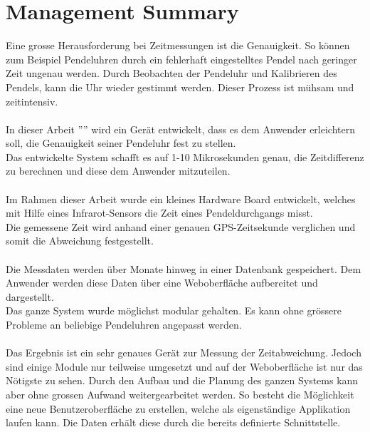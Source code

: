 \section{Management Summary}
Eine grosse Herausforderung bei Zeitmessungen ist die Genauigkeit. So können zum Beispiel Pendeluhren durch ein fehlerhaft eingestelltes Pendel nach geringer Zeit ungenau werden. Durch Beobachten der Pendeluhr und Kalibrieren des Pendels, kann die Uhr wieder gestimmt werden. Dieser Prozess ist mühsam und zeitintensiv.\\
\\
In dieser Arbeit ''\documenttitle'' wird ein Gerät entwickelt, dass es dem Anwender erleichtern soll, die Genauigkeit seiner Pendeluhr fest zu stellen.\\
Das entwickelte System schafft es auf 1-10 Mikrosekunden genau, die Zeitdifferenz zu berechnen und diese dem Anwender mitzuteilen.\\
\\
Im Rahmen dieser Arbeit wurde ein kleines Hardware Board entwickelt, welches mit Hilfe eines Infrarot-Sensors die Zeit eines Pendeldurchgangs misst.\\
Die gemessene Zeit wird anhand einer genauen GPS-Zeitsekunde verglichen und somit die Abweichung festgestellt.\\
\\
Die Messdaten werden über Monate hinweg in einer Datenbank gespeichert.
Dem Anwender werden diese Daten über eine Weboberfläche aufbereitet und dargestellt.\\
Das ganze System wurde möglichst modular gehalten. Es kann ohne grössere Probleme an beliebige Pendeluhren angepasst werden.\\
\\
Das Ergebnis ist ein sehr genaues Gerät zur Messung der Zeitabweichung. 
Jedoch sind einige Module nur teilweise umgesetzt und auf der Weboberfläche ist nur das Nötigste zu sehen. 
Durch den Aufbau und die Planung des ganzen Systems kann aber ohne grossen Aufwand weitergearbeitet werden. 
So besteht die Möglichkeit eine neue Benutzeroberfläche zu erstellen, welche als eigenständige Applikation laufen kann. Die Daten erhält diese durch die bereits definierte Schnittstelle.

